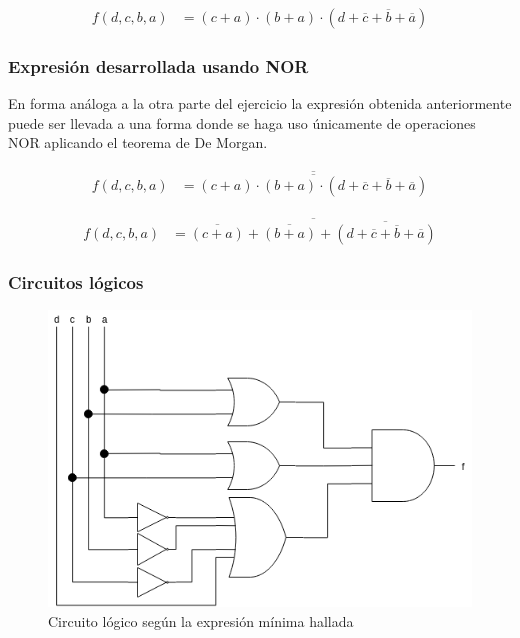 \begin{align*}
f(d,c,b,a) & = {(c+a)}
\cdot {(b+a)}
\cdot {(d+\overline{c}+\overline{b}+\overline{a})} 
\end{align*}

\subsubsection{Expresión desarrollada usando NOR}
En forma an\'aloga a la otra parte del ejercicio la expresi\'on obtenida anteriormente puede ser llevada a una forma donde se haga
uso \'unicamente de operaciones NOR aplicando el teorema de De Morgan.

\begin{align*}
f(d,c,b,a) & = \overline{
    \overline{
        {(c+a)}
        \cdot {(b+a)}
        \cdot {(d+\overline{c}+\overline{b}+\overline{a})} 
    }
}
\end{align*}

\begin{align*}
f(d,c,b,a) & = \overline{
    \overline{(c+a)}
    + \overline{(b+a)}
    + \overline{(d+\overline{c}+\overline{b}+\overline{a})} 
}
\end{align*}

\subsubsection{Circuitos lógicos}

\begin{figure}[H]
    \centering
    \includegraphics[scale=0.5]{EJ_2/resources/ej_2_maxterms_0.png}
    \caption{Circuito l\'ogico seg\'un la expresi\'on m\'inima hallada}
\end{figure}

